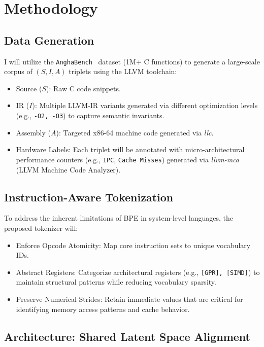 \documentclass[11pt]{article}
\begin{document}
\section{Methodology}
\subsection{Data Generation}

I will utilize the \texttt{AnghaBench}~\cite{da2021anghabench} dataset (1M+ C functions) to generate a large-scale corpus of $(S, I, A)$ triplets using the LLVM toolchain:

\begin{itemize}
    \item Source ($S$): Raw C code snippets.
    \item IR ($I$): Multiple LLVM-IR variants generated via different optimization levels (e.g., \texttt{-O2, -O3}) to capture semantic invariants.
    \item Assembly ($A$): Targeted x86-64 machine code generated via \textit{llc}.
    \item Hardware Labels: Each triplet will be annotated with micro-architectural performance counters (e.g., \texttt{IPC}, \texttt{Cache Misses}) generated via \textit{llvm-mca} (LLVM Machine Code Analyzer).
\end{itemize}

\subsection{Instruction-Aware Tokenization}

To address the inherent limitations of BPE in system-level languages, the proposed tokenizer will:

\begin{itemize}
    \item Enforce Opcode Atomicity: Map core instruction sets to unique vocabulary IDs.
    \item Abstract Registers: Categorize architectural registers (e.g., \texttt{[GPR], [SIMD]}) to maintain structural patterns while reducing vocabulary sparsity.
    \item Preserve Numerical Strides: Retain immediate values that are critical for identifying memory access patterns and cache behavior.
\end{itemize}

\subsection{Architecture: Shared Latent Space Alignment}
\end{document}
